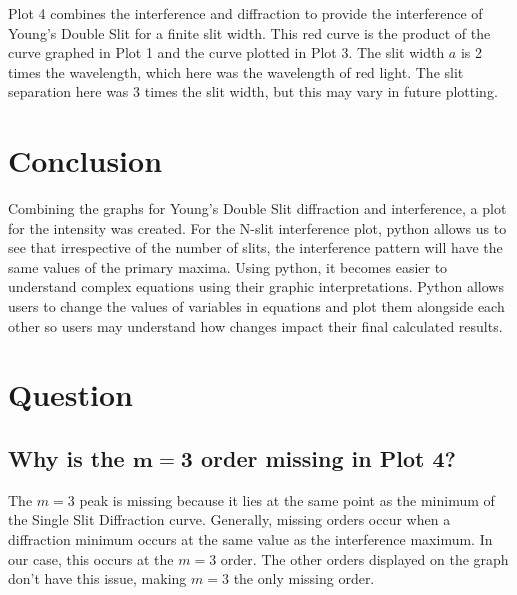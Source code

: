 \documentclass[12pt]{article}
\begin{document}
Plot 4 combines the interference and diffraction to provide the interference of Young's Double Slit for a finite slit width. 
This red curve is the product of the curve graphed in Plot 1 and the curve plotted in Plot 3.
The slit width $a$ is 2 times the wavelength, which here was the wavelength of red light. 
The slit separation here was 3 times the slit width, but this may vary in future plotting. 
\newpage
\section{Conclusion}
Combining the graphs for Young's Double Slit diffraction and interference, a plot for the intensity was created. 
For the N-slit interference plot, python allows us to see that irrespective of the number of slits, the interference pattern will have the same values of the primary maxima.
Using python, it becomes easier to understand complex equations using their graphic interpretations. 
Python allows users to change the values of variables in equations and plot them alongside each other so users may understand how changes impact their final calculated results.
\newpage
\section{Question}
\subsection*{Why is the $\bm{m=3}$ order missing in Plot 4?}
The $m=3$ peak is missing because it lies at the same point as the minimum of the Single Slit Diffraction curve.
Generally, missing orders occur when a diffraction minimum occurs at the same value as the interference maximum.
In our case, this occurs at the $m=3$ order. 
The other orders displayed on the graph don't have this issue, making $m=3$ the only missing order.
\end{document}
